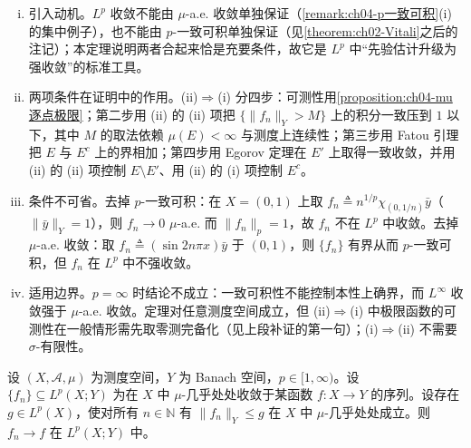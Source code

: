 \documentclass[../../main.tex]{subfiles}%
\begin{document}
\begin{remark}
\begin{enumerate}[(i)]
\item 引入动机。$L^p$ 收敛不能由 $\mu$-a.e. 收敛单独保证（\cref{remark:ch04-p一致可积}(i) 的集中例子），也不能由 $p$-一致可积单独保证（见\cref{theorem:ch02-Vitali}之后的注记）；本定理说明两者合起来恰是充要条件，故它是 $L^p$ 中“先验估计升级为强收敛”的标准工具。

\item 两项条件在证明中的作用。(ii)$\Rightarrow$(i) 分四步：可测性用\cref{proposition:ch04-mu逐点极限}；第二步用 (ii) 的 (ii) 项把 $\{\|f_n\|_Y>M\}$ 上的积分一致压到 $1$ 以下，其中 $M$ 的取法依赖 $\mu(E)<\infty$ 与测度上连续性；第三步用 Fatou 引理把 $E$ 与 $E^c$ 上的界相加；第四步用 Egorov 定理在 $E'$ 上取得一致收敛，并用 (ii) 的 (ii) 项控制 $E\setminus E'$、用 (ii) 的 (i) 项控制 $E^c$。

\item 条件不可省。去掉 $p$-一致可积：在 $X=(0,1)$ 上取 $f_n\triangleq n^{1/p}\chi_{(0,1/n)}\bar y$（$\|\bar y\|_Y=1$），则 $f_n\to0$ $\mu$-a.e. 而 $\|f_n\|_p=1$，故 $f_n$ 不在 $L^p$ 中收敛。去掉 $\mu$-a.e. 收敛：取 $f_n\triangleq(\sin2n\pi x)\bar y$ 于 $(0,1)$，则 $\{f_n\}$ 有界从而 $p$-一致可积，但 $f_n$ 在 $L^p$ 中不强收敛。

\item 适用边界。$p=\infty$ 时结论不成立：一致可积性不能控制本性上确界，而 $L^\infty$ 收敛强于 $\mu$-a.e. 收敛。定理对任意测度空间成立，但 (ii)$\Rightarrow$(i) 中极限函数的可测性在一般情形需先取零测完备化（见上段补证的第一句）；(i)$\Rightarrow$(ii) 不需要 $\sigma$-有限性。
\end{enumerate}
\end{remark}

\begin{theorem}[控制收敛定理]\label{theorem:ch04-控制收敛}
设 $(X,\mathcal{A},\mu)$ 为测度空间，$Y$ 为 Banach 空间，$p\in[1,\infty)$。设 $\{f_n\}\subseteq L^p(X;Y)$ 为在 $X$ 中 $\mu$-几乎处处收敛于某函数 $f:X\to Y$ 的序列。设存在 $g\in L^p(X)$，使对所有 $n\in\mathbb{N}$ 有 $\|f_n\|_Y\leqslant g$ 在 $X$ 中 $\mu$-几乎处处成立。则 $f_n\to f$ 在 $L^p(X;Y)$ 中。
\end{theorem}
\end{document}
